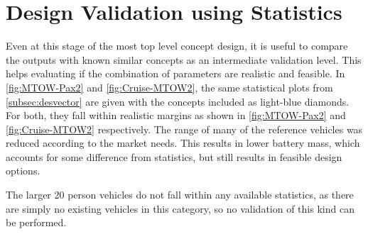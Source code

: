 \section{Design Validation using Statistics} \label{sec:statsVal}

Even at this stage of the most top level concept design, it is useful to compare the outputs with known similar concepts as an intermediate validation level. This helps evaluating if the combination of parameters are realistic and feasible. In \autoref{fig:MTOW-Pax2} and \autoref{fig:Cruise-MTOW2}, the same statistical plots from \autoref{subsec:desvector} are given with the concepts included as light-blue diamonds. For both, they fall within realistic margins as shown in \autoref{fig:MTOW-Pax2} and \autoref{fig:Cruise-MTOW2} respectively. The range of many of the reference vehicles was reduced according to the market needs. This results in lower battery mass, which accounts for some difference from statistics, but still results in feasible design options. 

The larger 20 person vehicles do not fall within any available statistics, as there are simply no existing vehicles in this category, so no validation of this kind can be performed.

